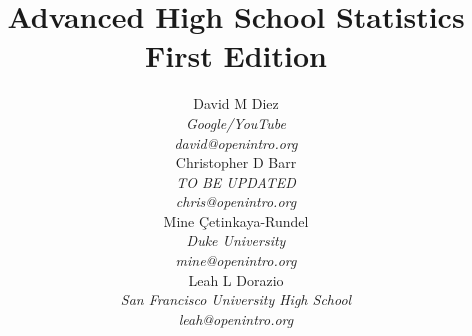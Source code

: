 
\title{\huge Advanced High School Statistics\vspace{1.5mm} \\ \Large First Edition}
\author{David M Diez \\
\small\emph{Google/YouTube} \\
\vspace{6mm}%
\small\emph{david@openintro.org} \\
Christopher D Barr \\
\small\emph{{\color{red}TO BE UPDATED}} \\
\vspace{6mm}%
\small\emph{chris@openintro.org} \\
Mine \c{C}etinkaya-Rundel \\
\small\emph{Duke University} \\
\vspace{6mm}%
\small\emph{mine@openintro.org} \\
Leah L Dorazio \\
\small\emph{San Francisco University High School} \\
\small\emph{leah@openintro.org}}
